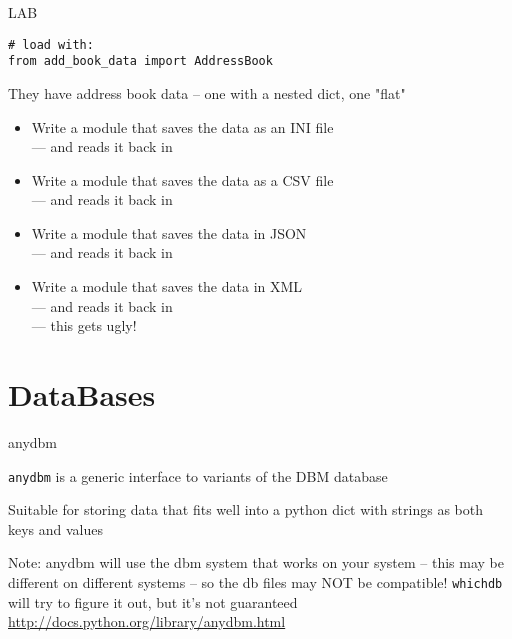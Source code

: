 \documentclass{beamer}
\begin{document}
\begin{frame}[fragile]{LAB}

\begin{verbatim}
# load with:
from add_book_data import AddressBook
\end{verbatim}

They have address book data -- one with a nested dict, one "flat"

\begin{itemize}
  \item Write a module that saves the data as an INI file\\
        --- and reads it back in
  \item Write a module that saves the data as a CSV file\\
        --- and reads it back in
  \item Write a module that saves the data in JSON\\
        --- and reads it back in
  \item Write a module that saves the data in XML\\
        --- and reads it back in \\
        --- this gets ugly!
\end{itemize}

\end{frame}


\section{DataBases} 

\begin{frame}[fragile]{anydbm}

\vfill
{\Large \verb|anydbm| is a generic interface to variants of the DBM database}

\vfill
{\Large Suitable for storing data that fits well into a python dict with strings as both keys and values}

\vfill
{\Large Note: anydbm will use the dbm system that works on your system --
        this may be different on different systems -- so the db files may NOT
        be compatible! \verb|whichdb| will try to figure it out, but it's not
        guaranteed}
\vfill
\url{http://docs.python.org/library/anydbm.html}
\end{frame} 
\end{document}
